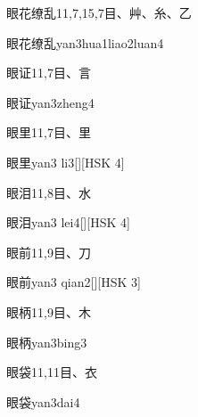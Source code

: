 \begin{entry}{眼花缭乱}{11,7,15,7}{⽬、⾋、⽷、⼄}
  \begin{phonetics}{眼花缭乱}{yan3hua1liao2luan4}
  \end{phonetics}
\end{entry}

\begin{entry}{眼证}{11,7}{⽬、⾔}
  \begin{phonetics}{眼证}{yan3zheng4}
  \end{phonetics}
\end{entry}

\begin{entry}{眼里}{11,7}{⽬、⾥}
  \begin{phonetics}{眼里}{yan3 li3}[][HSK 4]
  \end{phonetics}
\end{entry}

\begin{entry}{眼泪}{11,8}{⽬、⽔}
  \begin{phonetics}{眼泪}{yan3 lei4}[][HSK 4]
  \end{phonetics}
\end{entry}

\begin{entry}{眼前}{11,9}{⽬、⼑}
  \begin{phonetics}{眼前}{yan3 qian2}[][HSK 3]
  \end{phonetics}
\end{entry}

\begin{entry}{眼柄}{11,9}{⽬、⽊}
  \begin{phonetics}{眼柄}{yan3bing3}
  \end{phonetics}
\end{entry}

\begin{entry}{眼袋}{11,11}{⽬、⾐}
  \begin{phonetics}{眼袋}{yan3dai4}
  \end{phonetics}
\end{entry}


